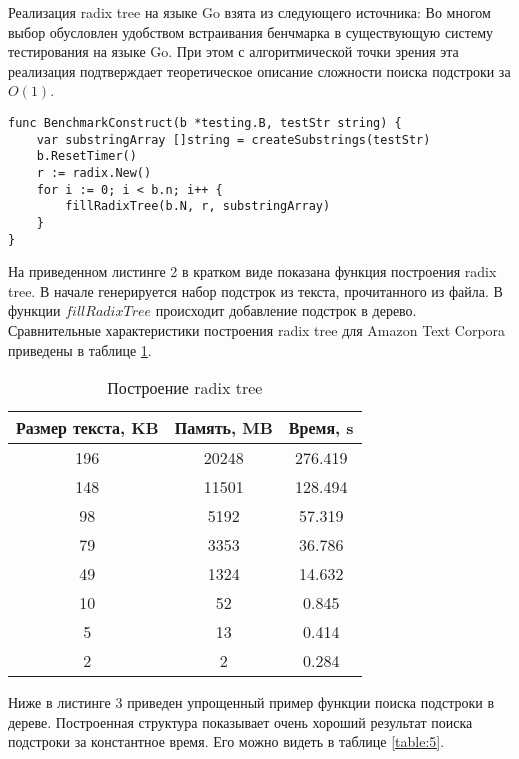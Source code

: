 Реализация radix tree на языке Go взята из следующего источника: \cite{golang2016sa}
Во многом выбор обусловлен удобством встраивания бенчмарка в существующую систему тестирования на языке Go.
При этом с алгоритмической точки зрения эта реализация подтверждает
теоретическое описание сложности поиска подстроки за $O(1)$.
\newpage
\begin{lstlisting}[caption=Radix tree example]
func BenchmarkConstruct(b *testing.B, testStr string) {
	var substringArray []string = createSubstrings(testStr)
	b.ResetTimer()
	r := radix.New()
	for i := 0; i < b.n; i++ {
		fillRadixTree(b.N, r, substringArray)
	}
}
\end{lstlisting}

На приведенном листинге 2 в кратком виде показана функция построения radix tree.
В начале генерируется набор подстрок из текста, прочитанного из файла. В функции $fillRadixTree$
происходит добавление подстрок в дерево. Сравнительные характеристики построения radix tree
для Amazon Text Corpora \cite{amazon2013text} приведены в таблице \ref{table:4}.


\begin{table}[h!]
    \centering
    \begin{tabular}{|c|c|c|}
        \hline
        Размер текста, KB & Память, MB & Время, s\\
        \hline
        196 & 20248 & 276.419\\
        \hline
        148 & 11501 & 128.494\\
        \hline
        98 & 5192 & 57.319\\
        \hline
        79 & 3353 & 36.786\\
        \hline
        49 & 1324 & 14.632\\
        \hline
        10 & 52 & 0.845\\
        \hline
        5 & 13 & 0.414\\
        \hline
        2 & 2 & 0.284\\
        \hline
    \end{tabular}
    \caption{Построение radix tree}
    \label{table:4}
\end{table}

Ниже в листинге 3 приведен упрощенный пример функции поиска подстроки в дереве.
Построенная структура показывает очень хороший результат поиска подстроки за константное время.
Его можно видеть в таблице \ref{table:5}.

